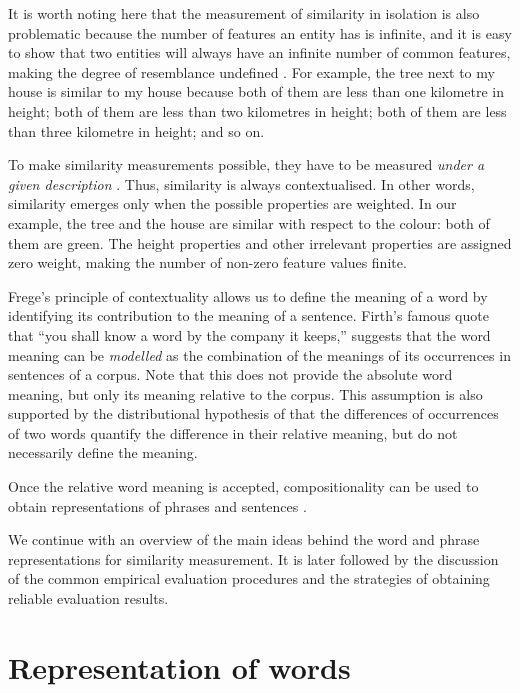 It is worth noting here that the measurement of similarity in isolation is also problematic because the number of features an entity has is infinite, and it is easy to show that two entities will always have an infinite number of common features, making the degree of resemblance undefined \cite{goodman1972problems,hahn1997concepts}. For example, the tree next to my house is similar to my house because both of them are less than one kilometre in height; both of them are less than two kilometres in height; both of them are less than three kilometre in height; and so on.

To make similarity measurements possible, they have to be measured \emph{under a given description} \cite{WCS:WCS1282,medin1993respects,Markman1996}. Thus, similarity is always contextualised. In other words, similarity emerges only when the possible properties are weighted. In our example, the tree and the house are similar with respect to the colour: both of them are green. The height properties and other irrelevant properties are assigned zero weight, making the number of non-zero feature values finite.

Frege's principle of contextuality allows us to define the meaning of a word by identifying its contribution to the meaning of a sentence. Firth's \citeyearpar{firth1957lingtheory} famous quote that ``you shall know a word by the company it keeps,'' suggests that the word meaning can be \emph{modelled} as the combination of the meanings of its occurrences in sentences of a corpus. Note that this does not provide the absolute word meaning, but only its meaning relative to the corpus. This assumption is also supported by the distributional hypothesis of  that the differences of occurrences of two words quantify the difference in their relative meaning, but do not necessarily define the meaning.

Once the relative word meaning is accepted, compositionality can be used to obtain representations of phrases and sentences \cite{THEO:THEO373,Dowty1980,sep-montague-semantics,DBLP:journals/corr/abs-1003-4394,baroni2014frege}.

We continue with an overview of the main ideas behind the word and phrase representations for similarity measurement. It is later followed by the discussion of the common empirical evaluation procedures and the strategies of obtaining reliable evaluation results.

\section{Representation of words}
\label{sec:distr-hypoth}

